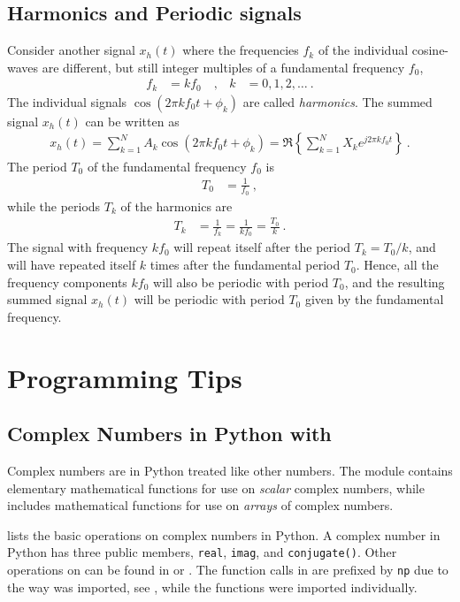 \subsection{Harmonics and Periodic signals}
Consider another signal $x_h(t)$ where the frequencies $f_k$ of the individual cosine-waves are different, but still integer multiples of a fundamental frequency $f_0$, 
\begin{align}
	f_k& = k f_0 \quad , & k&= 0,1,2, \ldots \:.
\end{align}
The individual signals $\cos(2\pi k f_0 t +\phi_k)$ are called \emph{harmonics}.
The summed signal $x_h(t)$ can be written as
\begin{align}
	x_h(t)= \sum_{k=1}^{N}  A_k \cos(2\pi k f_0 t +\phi_k)
	= \Re\left\{ \sum_{k=1}^{N}  X_k  e^{j2\pi k f_0 t } \right\}  \:.
	\label{eq:harmonicsum}
\end{align}
The period $T_0$ of the fundamental frequency $f_0$ is 
\begin{align}
	T_0 &= \frac{1}{f_0} \:,
\end{align}
while the periods $T_k$ of the harmonics are 
\begin{align}
	T_k &= \frac{1}{f_k} = \frac{1}{k f_0} = \frac{T_0}{k} \:.
\end{align}
The signal with frequency $kf_0$ will repeat itself after the period $T_k=T_0/k$, and will have repeated itself $k$ times after the fundamental period $T_0$. Hence, all the frequency components $kf_0$ will also be periodic with period $T_0$, and the resulting summed signal $x_h(t)$ will be periodic with period $T_0$ given by the fundamental frequency.

\section{Programming Tips}

\subsection{Complex Numbers in Python with \numpy}
Complex numbers are in Python treated like other numbers. The module \cmath contains elementary mathematical functions for use on \emph{scalar} complex numbers, while \numpy includes mathematical functions for use on \emph{arrays} of complex numbers.

 lists the basic operations on complex numbers in Python.
A complex number in Python has three public members, \verb|real|, \verb|imag|, and \verb|conjugate()|. Other operations on can be found in \cmath or \numpy. The \numpy function calls in  are prefixed by \verb|np| due to the way \numpy was imported, see , while the \cmath functions were imported individually. 

